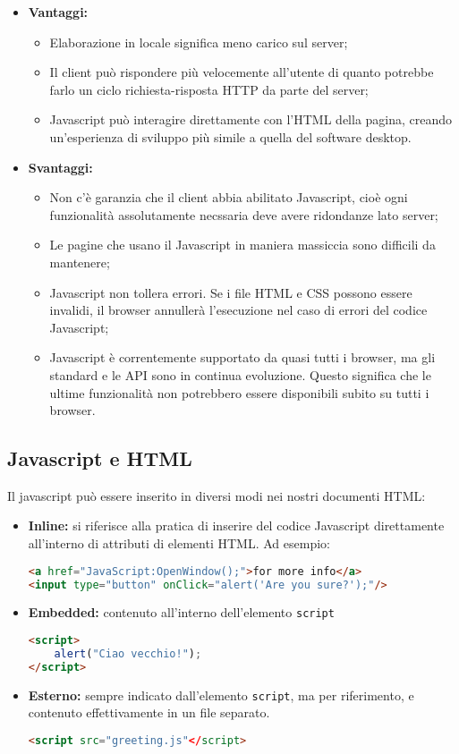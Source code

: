 \documentclass[a4paper,11pt]{article}
\begin{document}
\begin{itemize}
	\item \textbf{Vantaggi:}
		\begin{itemize}
			\item Elaborazione in locale significa meno carico sul server;
			\item Il client può rispondere più velocemente all'utente di quanto potrebbe farlo un ciclo richiesta-risposta HTTP da parte del server;
			\item Javascript può interagire direttamente con l'HTML della pagina, creando un'esperienza di sviluppo più simile a quella del software desktop.
		\end{itemize}
	\item \textbf{Svantaggi:}
		\begin{itemize}
			\item Non c'è garanzia che il client abbia abilitato Javascript, cioè ogni funzionalità assolutamente necssaria deve avere ridondanze lato server;
			\item Le pagine che usano il Javascript in maniera massiccia sono difficili da mantenere;
			\item Javascript non tollera errori. Se i file HTML e CSS possono essere invalidi, il browser annullerà l'esecuzione nel caso di errori del codice Javascript;
			\item Javascript è correntemente supportato da quasi tutti i browser, ma gli standard e le API sono in continua evoluzione. Questo significa che le ultime funzionalità non potrebbero essere disponibili subito su tutti i browser.
		\end{itemize}
\end{itemize}

\subsection{Javascript e HTML}

Il javascript può essere inserito in diversi modi nei nostri documenti HTML:
\begin{itemize}
	\item \textbf{Inline:} si riferisce alla pratica di inserire del codice Javascript direttamente all'interno di attributi di elementi HTML. Ad esempio:
\begin{lstlisting}[language=html, style=codestyle]	
<a href="JavaScript:OpenWindow();">for more info</a>
<input type="button" onClick="alert('Are you sure?');"/>
\end{lstlisting}
	\item \textbf{Embedded:} contenuto all'interno dell'elemento \lstinline|script|
\begin{lstlisting}[language=html, style=codestyle]	
<script>
	alert("Ciao vecchio!");
</script>
\end{lstlisting}
	\item \textbf{Esterno:} sempre indicato dall'elemento \lstinline|script|, ma per riferimento, e contenuto effettivamente in un file separato.
\begin{lstlisting}[language=html, style=codestyle]	
<script src="greeting.js"</script>
\end{lstlisting}
\end{itemize}
\end{document}
